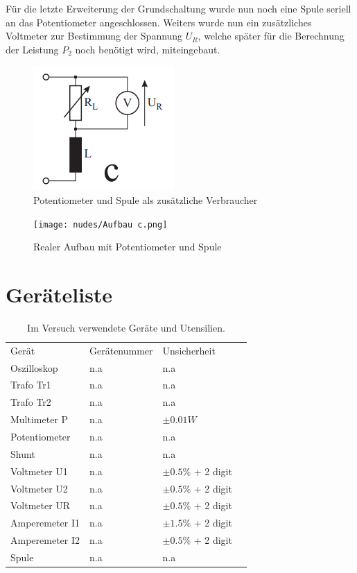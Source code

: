 \documentclass[12pt,a4paper,twoside]{article}
\begin{document}
\noindent
Für die letzte Erweiterung der Grundschaltung wurde nun noch eine Spule seriell an das Potentiometer angeschlossen. Weiters wurde nun ein zusätzliches Voltmeter zur Bestimmung der Spannung $U_{R}$, welche später für die Berechnung der Leistung $P_{2}$ noch benötigt wird, miteingebaut.

\begin{figure}[H]
    \centering
    \includegraphics[width=0.2\linewidth, angle=0]{nudes/Versuchsaufbau c.png}
    \caption{Potentiometer und Spule als zusätzliche Verbraucher \cite{teachcenter2}}
    \label{fig:AufbauC}
\end{figure}

\begin{figure}[H]
    \centering
    \texttt{[image: nudes/Aufbau c.png]}
    \caption{Realer Aufbau mit Potentiometer und Spule}
    \label{fig:RealerAufbauC}
\end{figure}



\section{Geräteliste} %

    \begin{table}[H]
        \centering
        \caption{Im Versuch verwendete Geräte und Utensilien.}
        \label{tab:geraete}
        \begin{tabular}{| l | l | l | l |}
            \hline
            Gerät & Gerätenummer  & Unsicherheit \\
            Oszilloskop & {n.a} & {n.a} \\
            Trafo Tr1 & {n.a} & {n.a} \\
            Trafo Tr2 & {n.a} & {n.a} \\
            Multimeter P & {n.a} & $\pm 0.01 W$ \cite{leybold}\\
            Potentiometer & {n.a} & {n.a} \\
            Shunt & {n.a} & {n.a} \\
            Voltmeter U1 & {n.a} & $\pm 0.5\%$ + 2 digit \\
            Voltmeter U2 & {n.a} & $\pm 0.5\%$ + 2 digit \\
            Voltmeter UR & {n.a} & $\pm 0.5\%$ + 2 digit \\
            Amperemeter I1 & {n.a} & $\pm 1.5\%$ + 2 digit \\
            Amperemeter I2 & {n.a} & $\pm 0.5\%$ + 2 digit \\
            Spule & {n.a} & {n.a} \\
            \hline
        \end{tabular}
    \end{table}
\end{document}

